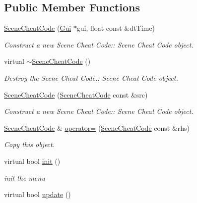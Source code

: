 \subsection*{Public Member Functions}
\begin{DoxyCompactItemize}
\item 
\hyperlink{class_scene_cheat_code_a9ab386f316841370e11d795d5189a0a1}{Scene\+Cheat\+Code} (\hyperlink{class_gui}{Gui} $\ast$gui, float const \&dt\+Time)
\begin{DoxyCompactList}\small\item\em Construct a new Scene Cheat Code\+:\+: Scene Cheat Code object. \end{DoxyCompactList}\item 
\mbox{\label{class_scene_cheat_code_aba65e8f91df770dfa408defd61a39cc5}} 
virtual \hyperlink{class_scene_cheat_code_aba65e8f91df770dfa408defd61a39cc5}{$\sim$\+Scene\+Cheat\+Code} ()
\begin{DoxyCompactList}\small\item\em Destroy the Scene Cheat Code\+:\+: Scene Cheat Code object. \end{DoxyCompactList}\item 
\hyperlink{class_scene_cheat_code_a9783a5dc52bea32ff3f493755d30d97a}{Scene\+Cheat\+Code} (\hyperlink{class_scene_cheat_code}{Scene\+Cheat\+Code} const \&src)
\begin{DoxyCompactList}\small\item\em Construct a new Scene Cheat Code\+:\+: Scene Cheat Code object. \end{DoxyCompactList}\item 
\hyperlink{class_scene_cheat_code}{Scene\+Cheat\+Code} \& \hyperlink{class_scene_cheat_code_a05f69fc79f5755b28f8cd0a8154b17e1}{operator=} (\hyperlink{class_scene_cheat_code}{Scene\+Cheat\+Code} const \&rhs)
\begin{DoxyCompactList}\small\item\em Copy this object. \end{DoxyCompactList}\item 
virtual bool \hyperlink{class_scene_cheat_code_aa952941065350cdde0390695b32ac31d}{init} ()
\begin{DoxyCompactList}\small\item\em init the menu \end{DoxyCompactList}\item 
virtual bool \hyperlink{class_scene_cheat_code_ab6ae0c8b3adbce736429e61a27966e31}{update} ()

\end{DoxyCompactItemize}
